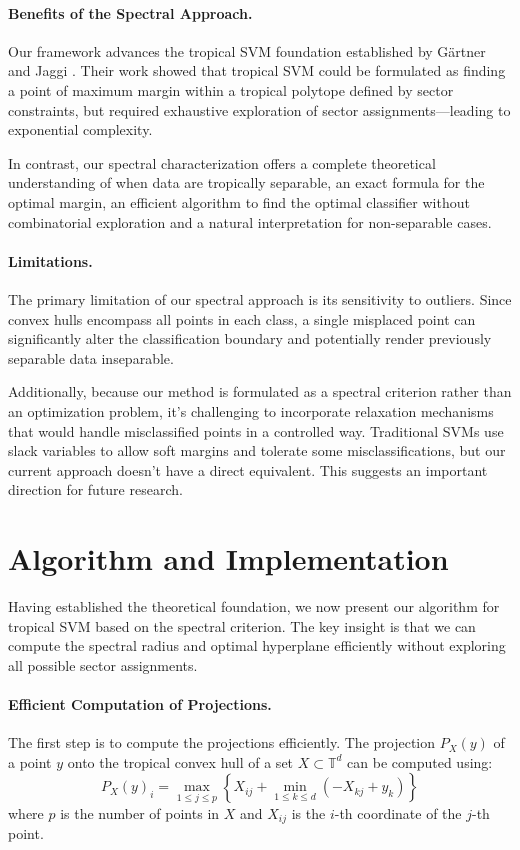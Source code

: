 \documentclass{article}
\newcommand{\trop}{\mathbb{T}}
\begin{document}
\paragraph{Benefits of the Spectral Approach.} 
Our framework advances the tropical SVM foundation established by Gärtner and Jaggi \cite{gartner2008}. Their work showed that tropical SVM could be formulated as finding a point of maximum margin within a tropical polytope defined by sector constraints, but required exhaustive exploration of sector assignments—leading to exponential complexity.

In contrast, our spectral characterization offers a complete theoretical understanding of when data are tropically separable, an exact formula for the optimal margin, an efficient algorithm to find the optimal classifier without combinatorial exploration and a natural interpretation for non-separable cases.

\paragraph{Limitations.} 
The primary limitation of our spectral approach is its sensitivity to outliers. Since convex hulls encompass all points in each class, a single misplaced point can significantly alter the classification boundary and potentially render previously separable data inseparable.

Additionally, because our method is formulated as a spectral criterion rather than an optimization problem, it's challenging to incorporate relaxation mechanisms that would handle misclassified points in a controlled way. Traditional SVMs use slack variables to allow soft margins and tolerate some misclassifications, but our current approach doesn't have a direct equivalent. This suggests an important direction for future research.

\section{Algorithm and Implementation}\label{sec:algorithm}

Having established the theoretical foundation, we now present our algorithm for tropical SVM based on the spectral criterion. The key insight is that we can compute the spectral radius and optimal hyperplane efficiently without exploring all possible sector assignments.

\paragraph{Efficient Computation of Projections.}
\label{subsec:computing_projections}
The first step is to compute the projections efficiently. The projection $P_X(y)$ of a point $y$ onto the tropical convex hull of a set $X \subset \trop^d$ can be computed using:
\[
P_X(y)_i = \max_{1 \leq j \leq p} \left\{X_{ij} + \min_{1 \leq k \leq d} \left(-X_{kj} + y_k\right)\right\}
\]
where $p$ is the number of points in $X$ and $X_{ij}$ is the $i$-th coordinate of the $j$-th point.
\end{document}
